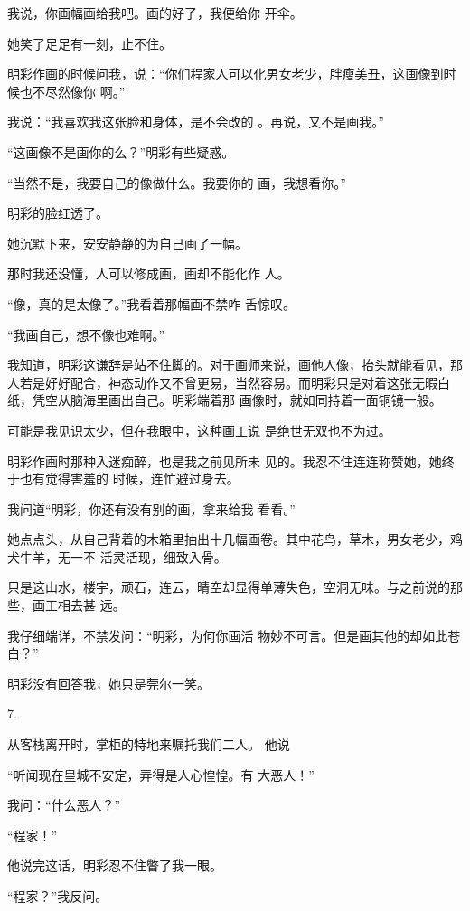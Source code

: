 \documentclass{article}
\begin{document}
我说，你画幅画给我吧。画的好了，我便给你
开伞。 


她笑了足足有一刻，止不住。 

明彩作画的时候问我，说：“你们程家人可以化男女老少，胖瘦美丑，这画像到时候也不尽然像你
啊。” 

我说：“我喜欢我这张脸和身体，是不会改的
。再说，又不是画我。” 


“这画像不是画你的么？”明彩有些疑惑。 

“当然不是，我要自己的像做什么。我要你的
画，我想看你。” 


\newpage

明彩的脸红透了。 


她沉默下来，安安静静的为自己画了一幅。 

那时我还没懂，人可以修成画，画却不能化作
人。 

“像，真的是太像了。”我看着那幅画不禁咋
舌惊叹。 


“我画自己，想不像也难啊。” 

我知道，明彩这谦辞是站不住脚的。对于画师来说，画他人像，抬头就能看见，那人若是好好配合，神态动作又不曾更易，当然容易。而明彩只是对着这张无暇白纸，凭空从脑海里画出自己。明彩端着那
画像时，就如同持着一面铜镜一般。 

可能是我见识太少，但在我眼中，这种画工说
是绝世无双也不为过。 

明彩作画时那种入迷痴醉，也是我之前见所未
\newpage
见的。我忍不住连连称赞她，她终于也有觉得害羞的
时候，连忙避过身去。 

我问道“明彩，你还有没有别的画，拿来给我
看看。” 

她点点头，从自己背着的木箱里抽出十几幅画卷。其中花鸟，草木，男女老少，鸡犬牛羊，无一不
活灵活现，细致入骨。 

只是这山水，楼宇，顽石，连云，晴空却显得单薄失色，空洞无味。与之前说的那些，画工相去甚
远。 

我仔细端详，不禁发问：“明彩，为何你画活
物妙不可言。但是画其他的却如此苍白？” 


明彩没有回答我，她只是莞尔一笑。 


7. 

\newpage

从客栈离开时，掌柜的特地来嘱托我们二人。
他说 

“听闻现在皇城不安定，弄得是人心惶惶。有
大恶人！” 


我问：“什么恶人？” 


“程家！” 


他说完这话，明彩忍不住瞥了我一眼。 


“程家？”我反问。 
\end{document}

